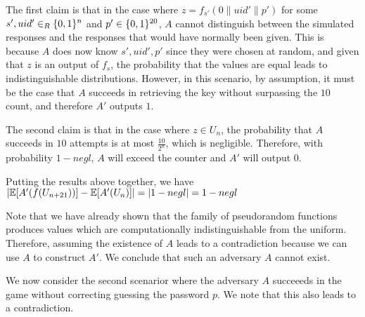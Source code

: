 \documentclass{article}
\begin{document}
\begin{enumerate}[,label=\alph*.]
\begin{mdbmarginx}{1ex}{0pt}{1ex}{0pt}
\noindent{}The first claim is that in the case where $z = f_{s'}(0 \| uid' \| p')$ for some $s',uid' \in_R \{0,1\}^n$
and $p' \in \{0,1\}^{20}$, $A$ cannot distinguish between the simulated responses and the responses
that would have normally been given. This is because $A$ does now know $s',uid',p'$ since they were
chosen at random, and given that $z$ is an output of $f_s$, the probability that the values 
are equal leads to indistinguishable distributions. However, in this scenario, by assumption, it
must be the case that $A$ succeeds in retrieving the key without surpassing the $10$ count, 
and therefore $A'$ outputs $1$.%

The second claim is that in the case where $z \in U_n$, the probability that $A$ succeeds 
in $10$ attempts is at most $\frac{10}{2^n}$, which is negligible. Therefore, with
probability $1 - negl$, $A$ will exceed the counter and $A'$ will output $0$.%

Putting the results above together, we have $|\mathbb{E}[A'(f(U_{n + 21}))] - \mathbb{E}[A'(U_n)]| = | 1 - negl | = 1 - negl$%

Note that we have already shown that the family of pseudorandom functions produces values 
which are computationally indistinguishable from the uniform. Therefore, assuming the existence of
$A$ leads to a contradiction because we can use $A$ to construct $A'$. We conclude that such an
adversary $A$ cannot exist. 
\mdfloatright{\ensuremath{\Box}}%
\end{mdbmarginx}%

We now consider the second scenarior where the adversary $A$ succeeeds in the game without correcting
guessing the password $p$. We note that this also leads to a contradiction.%


\end{enumerate}
\end{document}
